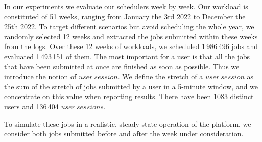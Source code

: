 \documentclass[conference]{IEEEtran}
\newcommand{\us}{\ensuremath{\mathit{user~session}}\xspace}
\newcommand{\uss}{\ensuremath{\mathit{user~sessions}}\xspace}
\begin{document}
In our experiments we evaluate our schedulers week by week.
Our workload is constituted of 51 weeks, ranging from January the 3rd 2022 to December the 25th 2022.
To target different scenarios but avoid scheduling the whole year, 
we randomly selected
12 weeks and
extracted the jobs submitted within these weeks from the logs. 
Over these 12 weeks of workloads, we scheduled 1\,986\,496 jobs and evaluated 1\,493\,151 of them.
The most important for a user is that all the jobs that have been submitted at once are finished as soon as possible.
Thus we introduce the notion of \us.
We define the stretch of a \us as the sum of the stretch of jobs submitted by a user in a 5-minute window, and we concentrate on this value when reporting results.
There have been 1083 distinct users and 136\,404 \uss.

To simulate these jobs in a realistic, steady-state operation of the
platform, we consider both jobs submitted before and after the week
under consideration.
\end{document}
